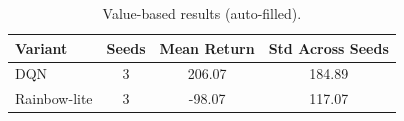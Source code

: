 \begin{table}[h]
\centering
\caption{Value-based results (auto-filled).}
\label{tab:dqnresults}
\begin{tabular}{lccc}
\toprule
Variant & Seeds & Mean Return & Std Across Seeds \\
\midrule
DQN & 3 & 206.07 & 184.89 \\
Rainbow-lite & 3 & -98.07 & 117.07 \\
\bottomrule
\end{tabular}
\end{table}
